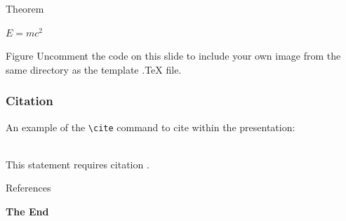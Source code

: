 \documentclass[aspectratio=169,xcolor=dvipsnames]{beamer}
\begin{document}

\begin{frame}{Theorem}
    \begin{theorem}
        $E = mc^2$
    \end{theorem}
\end{frame}


\begin{frame}{Figure}
    Uncomment the code on this slide to include your own image from the same directory as the template .TeX file.
\end{frame}


\begin{frame}[fragile] %
    \frametitle{Citation}
    An example of the \verb|\cite| command to cite within the presentation:\\~

    This statement requires citation \cite{p1}.
\end{frame}


\begin{frame}{References}
    \footnotesize
    
    
\end{frame}


\begin{frame}
    \Huge{\centerline{\textbf{The End}}}
\end{frame}

\end{document}
